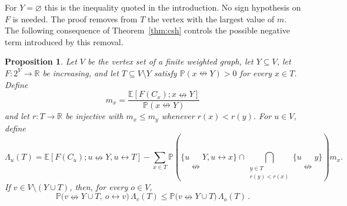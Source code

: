 \documentclass[11pt]{article}
\newtheorem{proposition}[theorem]{Proposition}
\theoremstyle{definition}
\theoremstyle{remark}
\newcommand{\PP}{\mathbb P}
\newcommand{\EE}{\mathbb E}
\newcommand{\con}{\leftrightarrow}
\newcommand{\ncon}{\nleftrightarrow}
\begin{document}
For $Y=\varnothing$ this is the inequality quoted in the introduction. No sign hypothesis
on $F$ is needed. The proof removes from $T$ the vertex with the largest value of $m$.
The following consequence of Theorem~\ref{thm:csh} controls the possible negative term
introduced by this removal.

\begin{proposition}\label{prop:s5}
Let $V$ be the vertex set of a finite weighted graph, let $Y\subseteq V$, let
$F:2^V\to\mathbb R$ be increasing, and let $T\subseteq V\setminus Y$ satisfy
$\PP(x\ncon Y)>0$ for every $x\in T$. Define
\[
 m_x=\frac{\EE[F(C_x);x\ncon Y]}{\PP(x\ncon Y)}
\]
and let $r:T\to\mathbb R$ be injective with $m_x\leq m_y$ whenever $r(x)<r(y)$. For
$u\in V$, define
\[
 \Lambda_u(T)=\EE[F(C_u);u\ncon Y,u\con T]
 -\sum_{x\in T}\PP\left(
   \{u\ncon Y,u\con x\}\cap
   \bigcap_{\substack{y\in T\\r(y)<r(x)}}\{u\ncon y\}\right)m_x .
\]
If $v\in V\setminus(Y\cup T)$, then, for every $o\in V$,
\[
 \PP\bigl(v\ncon Y\cup T,\ o\con v\bigr)\,\Lambda_v(T)
\leq \PP\bigl(v\ncon Y\cup T\bigr)\,\Lambda_o(T)\,.
\]
\end{proposition}
\end{document}
